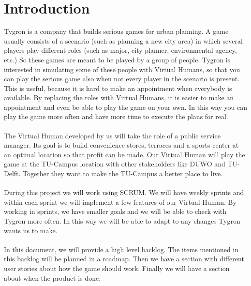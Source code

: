 \section{Introduction}

Tygron is a company that builds serious games for urban planning.
A game usually consists of a scenario (such as planning a new city area) in which several players play different roles (such as major, city planner, environmental agency, etc.)
So these games are meant to be played by a group of people.
Tygron is interested in simulating some of these people with Virtual Humans, so that you can play the serious game also when not every player in the scenario is present. This is useful, because it is hard to make an appointment when everybody is available. By replacing the roles with Virtual Humans, it is easier to make an appointment and even be able to play the game on your own. In this way you can play the game more often and have more time to execute the plans for real.
\\
\\
The Virtual Human developed by us will take the role of a public service manager. Its goal is to build convenience stores, terraces and a sports center at an optimal location so that profit can be made. Our Virtual Human will play the game at the TU-Campus location with other stakeholders like DUWO and TU-Delft. Together they want to make the TU-Campus a better place to live.
\\
\\
During this project we will work using SCRUM. We will have weekly sprints and within each sprint we will implement a few features of our Virtual Human. By working in sprints, we have smaller goals and we will be able to check with Tygron more often. In this way we will be able to adapt to any changes Tygron wants us to make.
\\
\\
In this document, we will provide a high level backlog. The items mentioned in this backlog will be planned in a roadmap. Then we have a section with different user stories about how the game should work. Finally we will have a section about when the product is done.
\\
\\


\newpage